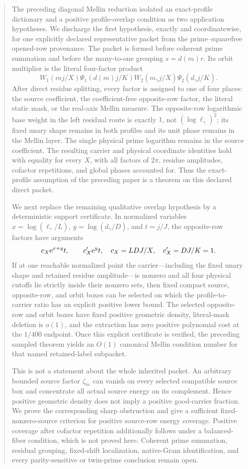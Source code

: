 \begin{abstract}
The preceding diagonal Mellin reduction isolated an exact-profile
dictionary and a positive profile-overlap condition as two application
hypotheses.  We discharge the first hypothesis, exactly and
coordinatewise, for one explicitly declared representative packet from
the prime--squarefree opened-row provenance.  The packet is formed before
coherent prime summation and before the many-to-one grouping
\(s=d(m)r\).  Its orbit multiplier is the literal four-factor product
\[
 W_1(mj/X)\Psi_1(d(m)j/K)
 W_2(m_\gamma j/X)\Psi_2(d_\gamma j/K).
\]
After direct residue splitting, every factor is assigned to one of four
places: the source coefficient, the coefficient-free opposite-row
factor, the literal static mask, or the real-axis Mellin measure.  The
opposite-row logarithmic base weight in the left residual route is
exactly \(1\), not \((\log\ell_\gamma)^2\); its fixed unary shape remains
in both profiles and its unit phase remains in the Mellin layer.  The
single physical prime logarithm remains in the source coefficient.  The
resulting carrier and physical coordinate
identities hold with equality for every \(X\), with all factors of
\(2\pi\), residue amplitudes, cofactor repetitions, and global phases
accounted for.  Thus the exact-profile assumption of the preceding paper
is a theorem on this declared direct packet.

We next replace the remaining qualitative overlap hypothesis by a
deterministic support certificate.  In normalized variables
\(x=\log(\ell_\gamma/L)\), \(y=\log(d_\gamma/D)\), and \(t=j/J\), the
opposite-row factors have arguments
\[
 c_X\e^{x+y}t,\qquad c'_X\e^yt,
 \quad c_X=LDJ/X,\quad c'_X=DJ/K=1.
\]
If at one reachable normalized point the carrier---including the fixed
unary shape and retained residue amplitude---is nonzero and all four
physical cutoffs lie strictly inside their nonzero sets, then fixed
compact source, opposite-row, and orbit boxes can be
selected on which the profile-to-carrier ratio has an explicit positive
lower bound.  The selected opposite-row and orbit boxes have fixed
positive geometric density, literal-mask deletion is \(o(1)\), and the
extraction has zero positive polynomial cost at the \(1/400\) endpoint.
Once this explicit certificate is verified, the preceding sampled
theorem yields an \(O(1)\) canonical Mellin condition number for that
named retained-label subpacket.

This is not a statement about the whole inherited packet.  An arbitrary
bounded source factor \(\zeta_m\) can vanish on every selected compatible
source box and concentrate all actual source energy on its complement.
Hence
positive geometric density does not imply a positive good-carrier
fraction.  We prove the corresponding sharp obstruction and give a
sufficient fixed-nonzero-source criterion for positive source-row energy
coverage.  Positive coverage after cofactor repetition additionally
follows under a balanced-fiber condition, which is not proved here.
Coherent prime summation, residual grouping, fixed-shift
localization, native-Gram identification, and every parity-sensitive or
twin-prime conclusion remain open.
\end{abstract}
